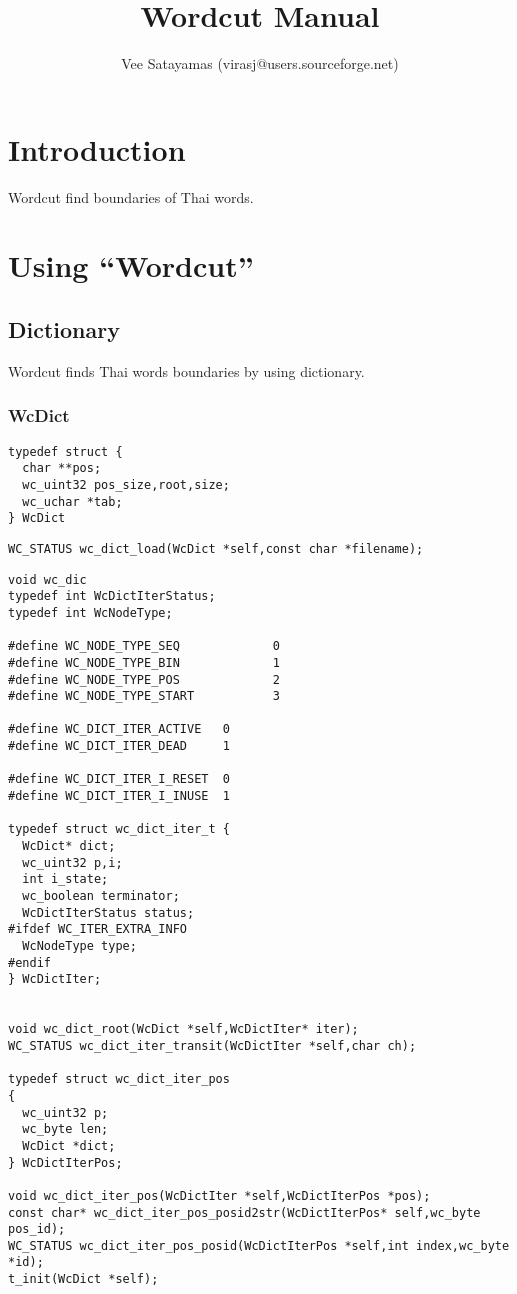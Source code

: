 \documentclass{book}
\title{Wordcut Manual}
\author{Vee Satayamas (virasj@users.sourceforge.net)}
\begin{document}
\maketitle


\chapter{Introduction}
Wordcut find boundaries of Thai words.
\chapter{Using ``Wordcut''}

\section{Dictionary}
Wordcut finds Thai words boundaries by using dictionary.
\subsection{WcDict}
\begin{verbatim}
typedef struct {
  char **pos;
  wc_uint32 pos_size,root,size;
  wc_uchar *tab;
} WcDict
\end{verbatim}

\begin{verbatim}
WC_STATUS wc_dict_load(WcDict *self,const char *filename);
\end{verbatim}

\begin{verbatim}
void wc_dic
typedef int WcDictIterStatus;
typedef int WcNodeType;

#define WC_NODE_TYPE_SEQ             0
#define WC_NODE_TYPE_BIN             1
#define WC_NODE_TYPE_POS             2
#define WC_NODE_TYPE_START           3

#define WC_DICT_ITER_ACTIVE   0
#define WC_DICT_ITER_DEAD     1

#define WC_DICT_ITER_I_RESET  0
#define WC_DICT_ITER_I_INUSE  1

typedef struct wc_dict_iter_t {
  WcDict* dict;
  wc_uint32 p,i;
  int i_state;
  wc_boolean terminator;
  WcDictIterStatus status;
#ifdef WC_ITER_EXTRA_INFO
  WcNodeType type;
#endif
} WcDictIter;


void wc_dict_root(WcDict *self,WcDictIter* iter);
WC_STATUS wc_dict_iter_transit(WcDictIter *self,char ch);

typedef struct wc_dict_iter_pos 
{
  wc_uint32 p;
  wc_byte len;
  WcDict *dict;
} WcDictIterPos;

void wc_dict_iter_pos(WcDictIter *self,WcDictIterPos *pos);
const char* wc_dict_iter_pos_posid2str(WcDictIterPos* self,wc_byte pos_id);
WC_STATUS wc_dict_iter_pos_posid(WcDictIterPos *self,int index,wc_byte *id);
t_init(WcDict *self);
\end{verbatim}
\end{document}
